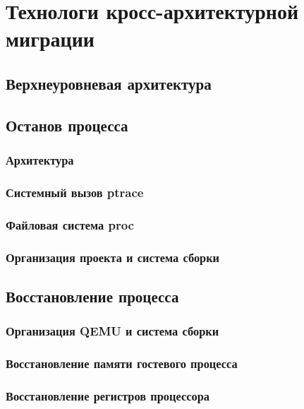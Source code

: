 \chapter{Технологи кросс-архитектурной миграции}

\section{Верхнеуровневая архитектура}

\section{Останов процесса}

\subsection{Архитектура}

\subsection{Системный вызов ptrace}

\subsection{Файловая система proc}

\subsection{Организация проекта и система сборки}

\section{Восстановление процесса}

\subsection{Организация QEMU и система сборки}

\subsection{Восстановление памяти гостевого процесса}

\subsection{Восстановление регистров процессора}
